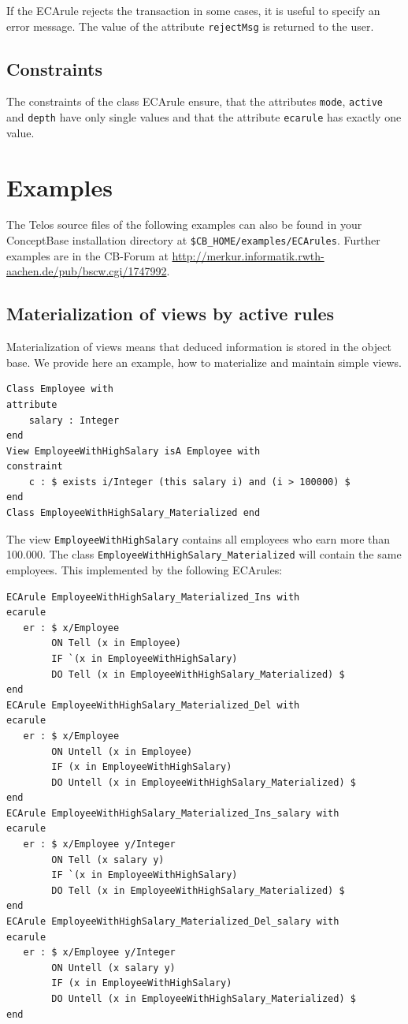 If the ECArule rejects the transaction in some cases, it is useful
to specify an error message. The value of the attribute {\tt rejectMsg}
is returned to the user.

\subsection{Constraints}

The constraints of the class ECArule ensure, that the attributes
{\tt mode}, {\tt active} and {\tt depth} have only
single values and that the attribute {\tt ecarule} has exactly one
value.


\section{Examples}

The Telos source files of the following examples can also be found in
your ConceptBase installation directory at
\verb+$CB_HOME/examples/ECArules+. 
Further examples are in the CB-Forum at
\url{http://merkur.informatik.rwth-aachen.de/pub/bscw.cgi/1747992}.

\subsection{Materialization of views by active rules}

Materialization of views means that deduced information is
stored in the object base.
We provide here an example, how to materialize and maintain
simple views.

{\small
\begin{verbatim}
Class Employee with
attribute
    salary : Integer
end
View EmployeeWithHighSalary isA Employee with
constraint
    c : $ exists i/Integer (this salary i) and (i > 100000) $
end
Class EmployeeWithHighSalary_Materialized end
\end{verbatim}
}

The view {\tt EmployeeWithHighSalary}
contains all employees who earn more than 100.000.
The class \verb+EmployeeWithHighSalary_Materialized+ will
contain the same employees. This implemented by the following
ECArules:

{\small
\begin{verbatim}
ECArule EmployeeWithHighSalary_Materialized_Ins with
ecarule
   er : $ x/Employee
        ON Tell (x in Employee)
        IF `(x in EmployeeWithHighSalary)
        DO Tell (x in EmployeeWithHighSalary_Materialized) $
end
ECArule EmployeeWithHighSalary_Materialized_Del with
ecarule
   er : $ x/Employee
        ON Untell (x in Employee)
        IF (x in EmployeeWithHighSalary)
        DO Untell (x in EmployeeWithHighSalary_Materialized) $
end
ECArule EmployeeWithHighSalary_Materialized_Ins_salary with
ecarule
   er : $ x/Employee y/Integer
        ON Tell (x salary y)
        IF `(x in EmployeeWithHighSalary)
        DO Tell (x in EmployeeWithHighSalary_Materialized) $
end
ECArule EmployeeWithHighSalary_Materialized_Del_salary with
ecarule
   er : $ x/Employee y/Integer
        ON Untell (x salary y)
        IF (x in EmployeeWithHighSalary)
        DO Untell (x in EmployeeWithHighSalary_Materialized) $
end
\end{verbatim}
}

